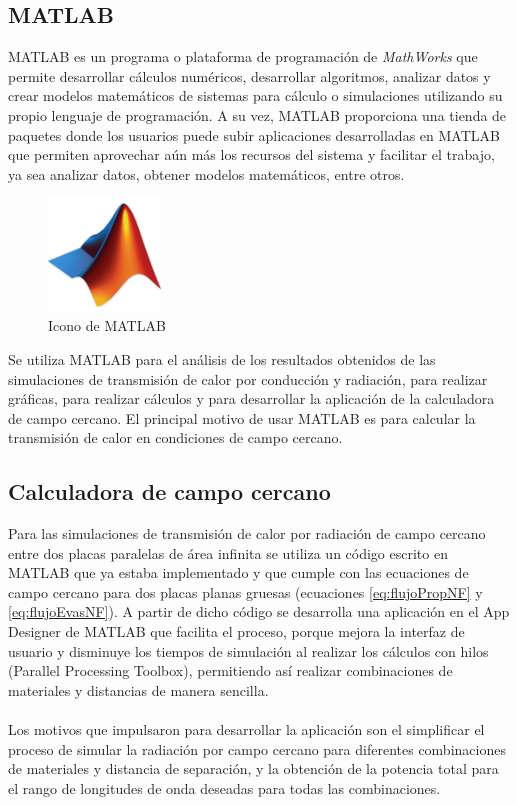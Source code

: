 \subsection{MATLAB}
MATLAB es un programa o plataforma de programación de \textit{MathWorks} que permite desarrollar cálculos numéricos, desarrollar algoritmos, analizar datos y crear modelos matemáticos de sistemas para cálculo o simulaciones utilizando su propio lenguaje de programación. A su vez, MATLAB proporciona una tienda de paquetes donde los usuarios puede subir aplicaciones desarrolladas en MATLAB que permiten aprovechar aún más los recursos del sistema y facilitar el trabajo, ya sea analizar datos, obtener modelos matemáticos, entre otros.\\
\begin{figure}[H]
	\centering
		\includegraphics[width=3cm]{figuras/MatlabIcon.png}
	\caption{Icono de MATLAB}
	\label{fig:MatlabIcon}
\end{figure}
Se utiliza MATLAB para el análisis de los resultados obtenidos de las simulaciones de transmisión de calor por conducción y radiación, para realizar gráficas, para realizar cálculos y para desarrollar la aplicación de la calculadora de campo cercano. El principal motivo de usar MATLAB es para calcular la transmisión de calor en condiciones de campo cercano.

\subsection{Calculadora de campo cercano} \label{sec:calc_campo_cercano}
Para las simulaciones de transmisión de calor por radiación de campo cercano entre dos placas paralelas de área infinita se utiliza un código escrito en MATLAB que ya estaba implementado y que cumple con las ecuaciones de campo cercano para dos placas planas gruesas (ecuaciones \eqref{eq:flujoPropNF} y \eqref{eq:flujoEvasNF}). A partir de dicho código se desarrolla una aplicación en el App Designer de MATLAB que facilita el proceso, porque mejora la interfaz de usuario y disminuye los tiempos de simulación al realizar los cálculos con hilos (Parallel Processing Toolbox), permitiendo así realizar combinaciones de materiales y distancias de manera sencilla.\\\\
Los motivos que impulsaron para desarrollar la aplicación son el simplificar el proceso de simular la radiación por campo cercano para diferentes combinaciones de materiales y distancia de separación, y la obtención de la potencia total para el rango de longitudes de onda deseadas para todas las combinaciones.\\

